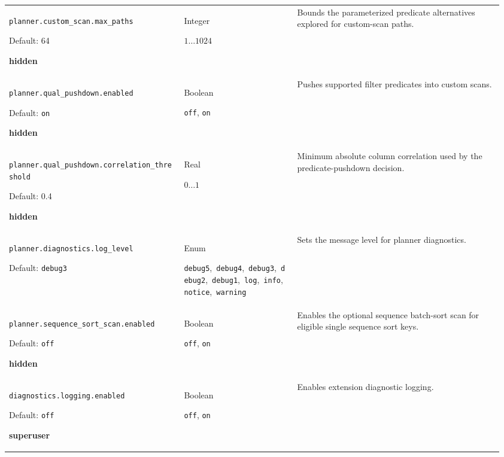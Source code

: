 \begin{longtable}{@{}>{\raggedright\arraybackslash}p{0.34\linewidth}>{\raggedright\arraybackslash}p{0.22\linewidth}>{\raggedright\arraybackslash}p{0.40\linewidth}@{}}
\nolinkurl{planner.custom_scan.max_paths}\par Default: 64\par \textbf{hidden} & Integer\par $1\ldots 1024$ & Bounds the parameterized predicate alternatives explored for custom-scan paths. \\[4pt]
\nolinkurl{planner.qual_pushdown.enabled}\par Default: \texttt{on}\par \textbf{hidden} & Boolean\par \texttt{off}, \texttt{on} & Pushes supported filter predicates into custom scans. \\[4pt]
\nolinkurl{planner.qual_pushdown.correlation_threshold}\par Default: 0.4\par \textbf{hidden} & Real\par $0\ldots 1$ & Minimum absolute column correlation used by the predicate-pushdown decision. \\[4pt]
\nolinkurl{planner.diagnostics.log_level}\par Default: \nolinkurl{debug3} & Enum\par \nolinkurl{debug5},\allowbreak\ \nolinkurl{debug4},\allowbreak\ \nolinkurl{debug3},\allowbreak\ \nolinkurl{debug2},\allowbreak\ \nolinkurl{debug1},\allowbreak\ \nolinkurl{log},\allowbreak\ \nolinkurl{info},\allowbreak\ \nolinkurl{notice},\allowbreak\ \nolinkurl{warning} & Sets the message level for planner diagnostics. \\[4pt]
\nolinkurl{planner.sequence_sort_scan.enabled}\par Default: \texttt{off}\par \textbf{hidden} & Boolean\par \texttt{off}, \texttt{on} & Enables the optional sequence batch-sort scan for eligible single sequence sort keys. \\[4pt]
\nolinkurl{diagnostics.logging.enabled}\par Default: \texttt{off}\par \textbf{superuser} & Boolean\par \texttt{off}, \texttt{on} & Enables extension diagnostic logging. \\[4pt]
\end{longtable}
\endgroup

